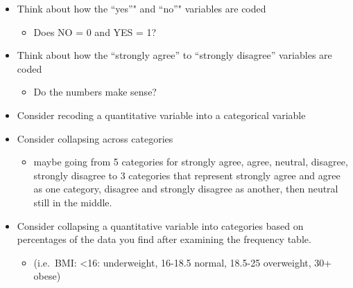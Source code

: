 \documentclass[]{article}
\providecommand{\tightlist}{%
  \setlength{\itemsep}{0pt}\setlength{\parskip}{0pt}}
\begin{document}
\begin{itemize}
\tightlist
\item
  Think about how the ``yes''" and ``no''" variables are coded

  \begin{itemize}
  \tightlist
  \item
    Does NO = 0 and YES = 1?\\
  \end{itemize}
\item
  Think about how the ``strongly agree'' to ``strongly disagree''
  variables are coded

  \begin{itemize}
  \tightlist
  \item
    Do the numbers make sense?\\
  \end{itemize}
\item
  Consider recoding a quantitative variable into a categorical
  variable\\
\item
  Consider collapsing across categories

  \begin{itemize}
  \tightlist
  \item
    maybe going from 5 categories for strongly agree, agree, neutral,
    disagree, strongly disagree to 3 categories that represent strongly
    agree and agree as one category, disagree and strongly disagree as
    another, then neutral still in the middle.\\
  \end{itemize}
\item
  Consider collapsing a quantitative variable into categories based on
  percentages of the data you find after examining the frequency table.

  \begin{itemize}
  \tightlist
  \item
    (i.e.~BMI: \textless{}16: underweight, 16-18.5 normal, 18.5-25
    overweight, 30+ obese)
  \end{itemize}
\end{itemize}
\end{document}
